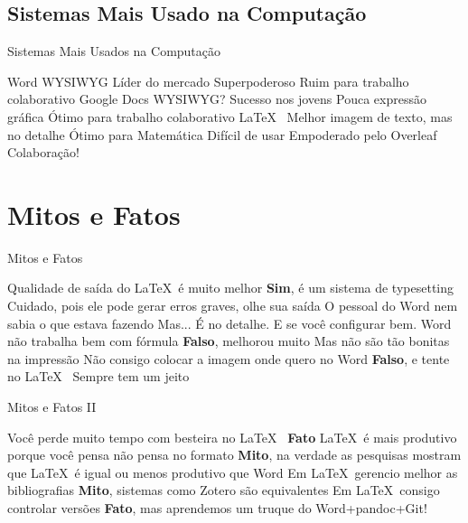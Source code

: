 \documentclass{beamer}
\begin{document}
\subsection{Sistemas Mais Usado na Computação}
\begin{frame}{Sistemas Mais Usados na Computação}
    \begin{outline}
        \1 Word
        \2 WYSIWYG
        \2 Líder do mercado
        \2 Superpoderoso
        \2 Ruim para trabalho colaborativo
        \1 Google Docs
        \2 WYSIWYG?
        \2 Sucesso nos jovens
        \2 Pouca expressão gráfica
        \2 Ótimo para trabalho colaborativo
        \1 \LaTeX\
        \2 Melhor imagem de texto, mas no detalhe
        \2 Ótimo para Matemática
        \2 Difícil de usar
        \2 Empoderado pelo Overleaf
        \3 Colaboração!
    \end{outline}
\end{frame}

\section{Mitos e Fatos}

\begin{frame}{Mitos e Fatos}
    \begin{outline}
        \1 Qualidade de saída do \LaTeX\ é muito melhor
        \2 \textbf{Sim}, é um sistema de typesetting
        \2 Cuidado, pois ele pode gerar erros graves, olhe sua saída
        \2 O pessoal do Word nem sabia o que estava fazendo
        \2 Mas... É no detalhe. E se você configurar bem.
        \1 Word não trabalha bem com fórmula
        \2 \textbf{Falso}, melhorou muito
        \2 Mas não são tão bonitas na impressão
        \1 Não consigo colocar a imagem onde quero no Word
        \2 \textbf{Falso}, e tente no \LaTeX\
        \2 Sempre tem um jeito
    \end{outline}
\end{frame}

\begin{frame}{Mitos e Fatos II }
    \begin{outline}
        \1 Você perde muito tempo com besteira no \LaTeX\
        \2 \textbf{Fato}
        \1 \LaTeX\ é mais produtivo porque você pensa não pensa no formato
        \2 \textbf{Mito}, na verdade as pesquisas mostram que \LaTeX\ é igual ou menos produtivo que Word
        \1 Em \LaTeX\ gerencio melhor as bibliografias
        \2 \textbf{Mito}, sistemas como Zotero são equivalentes
        \1 Em \LaTeX\ consigo controlar versões
        \2 \textbf{Fato}, mas aprendemos um truque do Word+pandoc+Git!
    \end{outline}
\end{frame}
\end{document}
